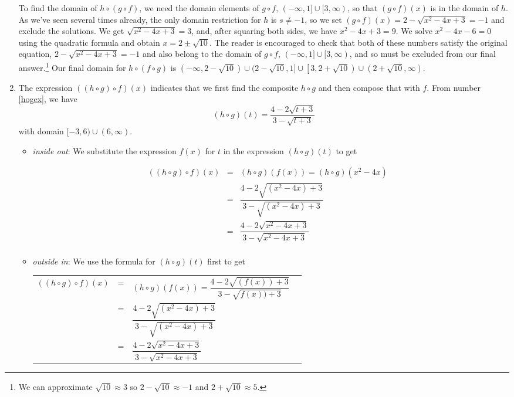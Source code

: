 \documentclass{ximera}
\begin{document}
\begin{ex}
\begin{enumerate}
\begin{itemize}
 \end{itemize}
 
To find the domain of $h \circ (g \circ f)$, we need the domain elements of $g \circ f$, $(-\infty, 1] \cup [3,\infty)$, so that $(g \circ f)(x)$ is in the domain of $h$.  As we've seen several times already, the only domain restriction for $h$ is $s \neq -1$, so we set  $(g \circ f)(x) = 2 - \sqrt{x^2-4x+3} = -1$ and exclude the solutions.     We get $\sqrt{x^2-4x+3} = 3$, and, after squaring both sides, we have $x^2-4x+3 = 9$.  We solve $x^2-4x-6 = 0$ using the quadratic formula and obtain $x = 2 \pm \sqrt{10}$.  The reader is encouraged to check that both of these numbers satisfy the original equation, $2 - \sqrt{x^2-4x+3} = -1$ and also belong to the domain of $g \circ f$, $(-\infty, 1] \cup [3,\infty)$, and so must be excluded from our final answer.\footnote{We can approximate $\sqrt{10} \approx 3$ so $2-\sqrt{10} \approx -1$ and $2+\sqrt{10} \approx 5$.}   Our final domain for $h \circ (f \circ g)$ is $(-\infty, 2 -\sqrt{10}) \cup (2 - \sqrt{10}, 1] \cup \left[3, 2 + \sqrt{10}\right) \cup \left(2+\sqrt{10}, \infty\right)$.

\item  The expression $((h \circ g) \circ f)(x)$ indicates that we first find the composite $h \circ g$ and then compose that with $f$.  From number \ref{hogex}, we have \[(h \circ g)(t) = \frac{4-2\sqrt{t+3}}{3-\sqrt{t+3}}\]  with domain $[-3, 6) \cup (6, \infty)$.
\begin{itemize}

\item  \textit{inside out}: We substitute the expression $f(x)$ for $t$ in the expression $(h \circ g)(t)$ to get 

\[ \begin{array}{rclr}
((h \circ g) \circ f)(x) & = & (h \circ g)(f(x)) = (h \circ g)\left(x^2-4x\right) & \\ [2pt]
                         & = & \dfrac{4-2\sqrt{\left(x^2-4x\right)+3}}{3-\sqrt{\left(x^2-4x\right)+3}} & \\ [20pt]
                         & = & \dfrac{4 - 2\sqrt{x^2-4x+3}}{3 - \sqrt{x^2-4x+3}} & \\ \end{array}\]

\item  \textit{outside in}:  We use the formula for $(h \circ g)(t)$ first to get
\begin{longtable}{rclr} $((h \circ g) \circ f)(x)$ & = & $(h \circ g)(f(x))=\dfrac{4-2\sqrt{(f(x))+3}}{3-\sqrt{f(x))+3}}$  & \\ [20pt]
  & = & $\dfrac{4 - 2\sqrt{\left(x^2-4x\right)+3}}{3 - \sqrt{\left(x^2-4x\right)+3}}$ & \\[20pt]
 & = & $\dfrac{4 - 2\sqrt{x^2-4x+3}}{3 - \sqrt{x^2-4x+3}}$ & \\
 \end{longtable}
 

\end{itemize}
\end{enumerate}
\end{ex}
\end{document}
